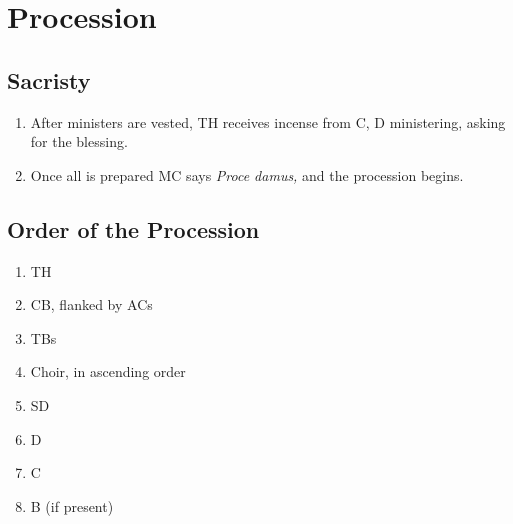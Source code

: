 \documentclass[letterpaper, twocolumn]{article}
\begin{document}
	\section*{Procession}
	\subsection*{Sacristy}
	\begin{enumerate}
		\item After ministers are vested, TH receives incense from C, D ministering, asking for the blessing.
		\item Once all is prepared MC says \textit{Proce damus,} and the procession begins.
	\end{enumerate}
	\subsection*{Order of the Procession}
	\begin{enumerate}
		\item TH
		\item CB, flanked by ACs
		\item TBs
		\item Choir, in ascending order
		\item SD
		\item D
		\item C
		\item B (if present)
	\end{enumerate}
\end{document}

